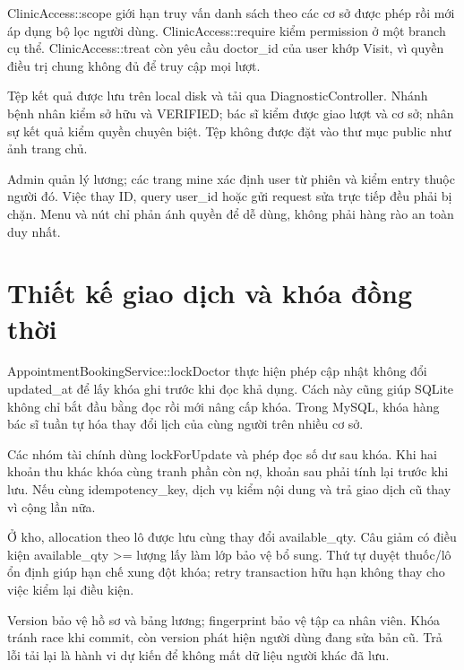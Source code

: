 Clinic\allowbreak{}Access:\allowbreak{}:\allowbreak{}scope giới hạn truy vấn danh sách theo các cơ sở được phép rồi mới áp dụng bộ lọc người dùng.\allowbreak{} Clinic\allowbreak{}Access:\allowbreak{}:\allowbreak{}require kiểm permission ở một branch cụ thể.\allowbreak{} Clinic\allowbreak{}Access:\allowbreak{}:\allowbreak{}treat còn yêu cầu doctor\_\allowbreak{}id của user khớp Visit, vì quyền điều trị chung không đủ để truy cập mọi lượt.\allowbreak{}

Tệp kết quả được lưu trên local disk và tải qua Diagnostic\allowbreak{}Controller.\allowbreak{} Nhánh bệnh nhân kiểm sở hữu và VERIFIED; bác sĩ kiểm được giao lượt và cơ sở; nhân sự kết quả kiểm quyền chuyên biệt.\allowbreak{} Tệp không được đặt vào thư mục public như ảnh trang chủ.\allowbreak{}

Admin quản lý lương; các trang mine xác định user từ phiên và kiểm entry thuộc người đó.\allowbreak{} Việc thay ID, query user\_\allowbreak{}id hoặc gửi request sửa trực tiếp đều phải bị chặn.\allowbreak{} Menu và nút chỉ phản ánh quyền để dễ dùng, không phải hàng rào an toàn duy nhất.\allowbreak{}


\section{Thiết kế giao dịch và khóa đồng thời}
Appointment\allowbreak{}Booking\allowbreak{}Service:\allowbreak{}:\allowbreak{}lock\allowbreak{}Doctor thực hiện phép cập nhật không đổi updated\_\allowbreak{}at để lấy khóa ghi trước khi đọc khả dụng.\allowbreak{} Cách này cũng giúp SQLite không chỉ bắt đầu bằng đọc rồi mới nâng cấp khóa.\allowbreak{} Trong My\allowbreak{}SQL, khóa hàng bác sĩ tuần tự hóa thay đổi lịch của cùng người trên nhiều cơ sở.\allowbreak{}

Các nhóm tài chính dùng lock\allowbreak{}For\allowbreak{}Update và phép đọc số dư sau khóa.\allowbreak{} Khi hai khoản thu khác khóa cùng tranh phần còn nợ, khoản sau phải tính lại trước khi lưu.\allowbreak{} Nếu cùng idempotency\_\allowbreak{}key, dịch vụ kiểm nội dung và trả giao dịch cũ thay vì cộng lần nữa.\allowbreak{}

Ở kho, allocation theo lô được lưu cùng thay đổi available\_\allowbreak{}qty.\allowbreak{} Câu giảm có điều kiện available\_\allowbreak{}qty >= lượng lấy làm lớp bảo vệ bổ sung.\allowbreak{} Thứ tự duyệt thuốc/\allowbreak{}lô ổn định giúp hạn chế xung đột khóa; retry transaction hữu hạn không thay cho việc kiểm lại điều kiện.\allowbreak{}

Version bảo vệ hồ sơ và bảng lương; fingerprint bảo vệ tập ca nhân viên.\allowbreak{} Khóa tránh race khi commit, còn version phát hiện người dùng đang sửa bản cũ.\allowbreak{} Trả lỗi tải lại là hành vi dự kiến để không mất dữ liệu người khác đã lưu.\allowbreak{}


